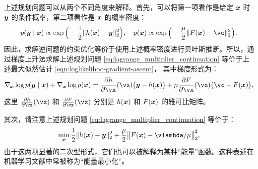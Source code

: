 \documentclass[../../book-main_zh.tex]{subfiles}
\begin{document}
上述规划问题可以从两个不同角度来解释。首先，可以将第一项看作是给定 $\bm{x}$ 时 $\bm{y}$ 的条件概率，第二项看作是 $\bm{x}$ 的概率密度：
\begin{equation}
  p(\y\mid \x) \propto \exp\Big(- \frac{1}{2}\|h(\x) - \y\|_2^2\Big), \quad 
    p(\x) \propto \exp\Big( - \frac{\mu}{2}\|F(\x) - \vc\|_2^2\Big).
\end{equation} 
因此，求解逆问题的约束优化等价于使用上述概率密度进行贝叶斯推断。所以，通过梯度上升法求解上述规划问题 \eqref{eq:lagrange_multiplier_continuation} 等价于上述最大似然估计 \eqref{eqn:loglikelihoo-gradient-ascent}，
其中梯度形式为：
\begin{equation}
   \nabla_{\x} \log p(\y \mid \x) + \nabla_{\x} \log p(\x)   =  \pdv{h}{\vx}(\vx)\big(\y - h(\x)\big) + \mu \pdv{F}{\vx}(\vx)\big(\vc - F(\x)\big),
\end{equation}
这里 $\pdv{h}{\vx}(\vx)$ 和 $\pdv{F}{\vx}(\vx)$ 分别是 $h(\bm{x})$ 和 $F(\bm{x})$ 的雅可比矩阵。

其次，请注意上述规划问题 \eqref{eq:lagrange_multiplier_continuation} 等价于：
\begin{equation}
\min_{\x} \frac{1}{2}\|h(\x) - \y\|_2^2 + \frac{\mu}{2} \big\|F(\x) - \vlambda/\mu\big\|_2^2,
\label{eqn:energy-minimization}
\end{equation} 
由于这两项显著的二次型形式，它们也可以被解释为某种“能量”函数。这种表述在机器学习文献中常被称为“能量最小化”。

\end{document}
